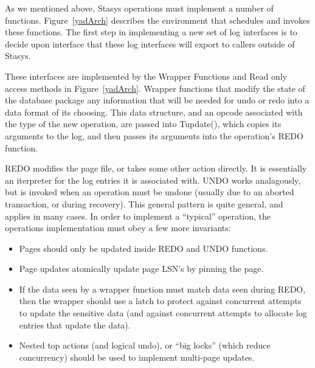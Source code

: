 \documentclass[letterpaper,twocolumn,10pt]{article}
\newcommand{\yad}{Stasys\xspace}
\begin{document}
As we mentioned above, \yad operations must implement a number of
functions.  Figure~\ref{yadArch} describes the environment that
schedules and invokes these functions.  The first step in implementing
a new set of log interfaces is to decide upon interface that these log
interfaces will export to callers outside of \yad.  

These interfaces are implemented by the Wrapper Functions and Read
only access methods in Figure~\ref{yadArch}.  Wrapper functions that
modify the state of the database package any information that will be
needed for undo or redo into a data format of its choosing.  This data
structure, and an opcode associated with the type of the new
operation, are passed into Tupdate(), which copies its arguments to
the log, and then passes its arguments into the operation's REDO
function.
 
REDO modifies the page file, or takes some other action directly.  It
is essentially an iterpreter for the log entries it is associated
with.  UNDO works analagously, but is invoked when an operation must
be undone (usually due to an aborted transaction, or during recovery).
This general pattern is quite general, and applies in many cases.  In
order to implement a ``typical'' operation, the operations
implementation must obey a few more invariants:

\begin{itemize}
\item Pages should only be updated inside REDO and UNDO functions.
\item Page updates atomically update page LSN's by pinning the page.
\item If the data seen by a wrapper function must match data seen
  during REDO, then the wrapper should use a latch to protect against
  concurrent attempts to update the sensitive data (and against
  concurrent attempts to allocate log entries that update the data).
\item Nested top actions (and logical undo), or ``big locks'' (which
  reduce concurrency) should be used to implement multi-page updates.
\end{itemize}
\end{document}
